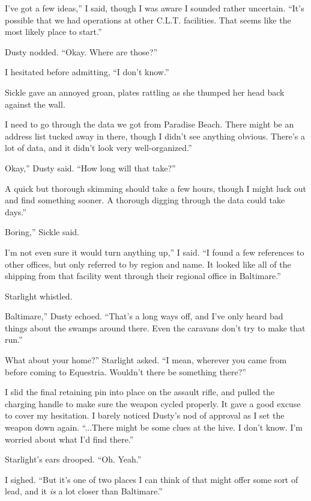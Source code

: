 \leavevmode{}I’ve got a few ideas,” I said, though I was aware I sounded rather uncertain. “It’s possible that we had operations at other C.L.T. facilities. That seems like the most likely place to start.”

Dusty nodded. “Okay. Where are those?”

I hesitated before admitting, “I don’t know.”

Sickle gave an annoyed groan, plates rattling as she thumped her head back against the wall.

\leavevmode{}I need to go through the data we got from Paradise Beach. There might be an address list tucked away in there, though I didn’t see anything obvious. There’s a lot of data, and it didn’t look very well-organized.”

\leavevmode{}Okay,” Dusty said. “How long will that take?”

\leavevmode{}A quick but thorough skimming should take a few hours, though I might luck out and find something sooner. A thorough digging through the data could take days.”

\leavevmode{}Boring,” Sickle said.

\leavevmode{}I’m not even sure it would turn anything up,” I said. “I found a few references to other offices, but only referred to by region and name. It looked like all of the shipping from that facility went through their regional office in Baltimare.”

Starlight whistled.

\leavevmode{}Baltimare,” Dusty echoed. “That’s a long ways off, and I’ve only heard bad things about the swamps around there. Even the caravans don’t try to make that run.”

\leavevmode{}What about your home?” Starlight asked. “I mean, wherever you came from before coming to Equestria. Wouldn’t there be something there?”

I slid the final retaining pin into place on the assault rifle, and pulled the charging handle to make sure the weapon cycled properly. It gave a good excuse to cover my hesitation. I barely noticed Dusty’s nod of approval as I set the weapon down again. “...There might be some clues at the hive. I don’t know. I’m worried about what I’d find there.”

Starlight’s ears drooped. “Oh. Yeah.”

I sighed. “But it’s one of two places I can think of that might offer some sort of lead, and it \textit{is} a lot closer than Baltimare.”

